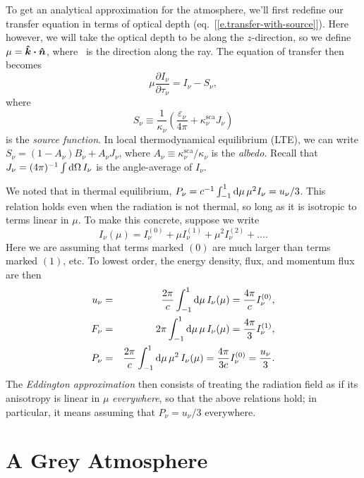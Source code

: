 To get an analytical approximation for the atmosphere, we'll first redefine our transfer equation in terms of optical depth (eq.~[\ref{e.transfer-with-source}]). Here however, we will take the optical depth to be along the $z$-direction, so we define $\mu = \boldsymbol{\hat{k}}\boldsymbol{\cdot}\boldsymbol{\hat{n}}$, where \unitn\ is the direction along the ray. The equation of transfer then becomes
\begin{equation}\label{e.planar}
\mu\frac{\partial I_{\nu}}{\partial\tau_{\nu}} = I_{\nu}-S_{\nu},
\end{equation}
where 
\begin{equation}\label{e.source}
S_{\nu} \equiv \frac{1}{\kappa_{\nu}}\left(\frac{\varepsilon_{\nu}}{4\pi} + \kappa_{\nu}^{\mathrm{sca}}J_{\nu}\right)
\end{equation}
is the \emph{source function}. In local thermodynamical equilibrium (LTE), we can write $S_{\nu} = (1-A_{\nu})B_{\nu} + A_{\nu}J_{\nu}$, where $A_{\nu} \equiv \kappa_{\nu}^{\mathrm{sca}}/\kappa_{\nu}$ is the \emph{albedo}.  Recall that $J_{\nu} = (4\pi)^{-1}\int\mathrm{d}\Omega\,I_{\nu}$ is the angle-average of $I_{\nu}$.

We noted that in thermal equilibrium, $P_{\nu} = c^{-1}\int_{-1}^{1}\mathrm{d}\mu\,\mu^{2}I_{\nu} = u_{\nu}/3$. This relation holds even when the radiation is not thermal, so long as it is isotropic to terms linear in $\mu$.  To make this concrete, suppose we write
\[ I_{\nu}(\mu) = I_{\nu}^{(0)} + \mu I_{\nu}^{(1)} + \mu^{2}I_{\nu}^{(2)} + \ldots. \]
Here we are assuming that terms marked $(0)$ are much larger than terms marked $(1)$, etc.  To lowest order, the energy density, flux, and momentum flux are then
\begin{eqnarray*}
u_{\nu} &=& \frac{2\pi}{c}\int_{-1}^{1}\mathrm{d}\mu\,I_{\nu}(\mu) = \frac{4\pi}{c} I_{\nu}^{(0)},\\
F_{\nu} &=& 2\pi\int_{-1}^{1}\mathrm{d}\mu\,\mu\,I_{\nu}(\mu) = \frac{4\pi}{3} I_{\nu}^{(1)},\\
P_{\nu} &=& \frac{2\pi}{c}\int_{-1}^{1}\mathrm{d}\mu\,\mu^{2}\,I_{\nu}(\mu) = \frac{4\pi}{3c}I_{\nu}^{(0)} = \frac{u_{\nu}}{3}.
\end{eqnarray*}
The \emph{Eddington approximation} then consists of treating the radiation field as if its anisotropy is linear in $\mu$ \emph{everywhere}, so that the above relations hold; in particular, it means assuming that $P_{\nu} = u_{\nu}/3$ everywhere.

\section[Grey Atmosphere]{A Grey Atmosphere}

